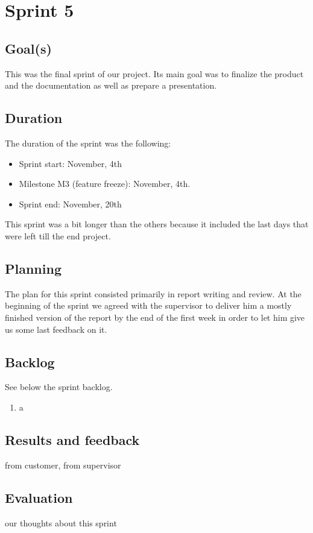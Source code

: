

\chapter{Sprint 5}
\label{Sprint0}

\section{Goal(s)}

This was the final sprint of our project. Its main goal was to
finalize the product and the documentation as well as prepare
a presentation.

\section{Duration}
The duration of the sprint was the following:
\begin{itemize}
\item Sprint start:  November, 4th
\item Milestone M3 (feature freeze): November, 4th.
\item Sprint end: November, 20th
\end{itemize}

This sprint was a bit longer than the others because it included the last days
that were left till the end project.

\section{Planning}

The plan for this sprint consisted primarily in report writing and review.
At the beginning of the sprint we agreed with the supervisor to deliver him a mostly
finished version of the report by the end of the first week in order to let him
give us some last feedback on it.

\section{Backlog}
See below the sprint backlog.
\begin{enumerate}[1.]
\item a
\end{enumerate}

\section{Results and feedback}

from customer, from supervisor
\section{Evaluation}
our thoughts about this sprint
